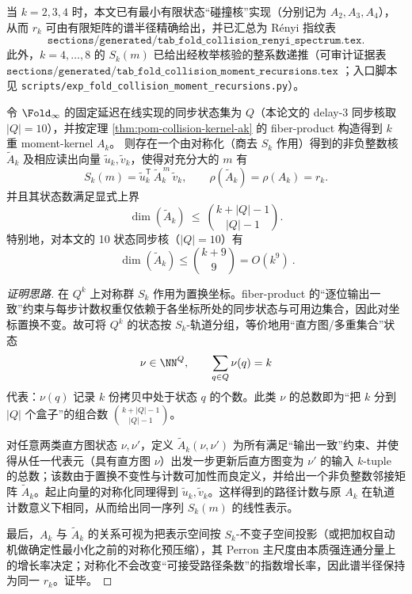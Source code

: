 \begin{remark}[与 $k=2,3,4$ 的一致性检查（已生成指纹）]\label{rem:pom-ak-consistency}
当 $k=2,3,4$ 时，本文已有最小有限状态“碰撞核”实现（分别记为 $A_2,A_3,A_4$），从而 $r_k$ 可由有限矩阵的谱半径精确给出，并已汇总为 Rényi 指纹表
\[
\texttt{sections/generated/tab\_fold\_collision\_renyi\_spectrum.tex}.
\]
此外，$k=4,\dots,8$ 的 $S_k(m)$ 已给出经枚举核验的整系数递推（可审计证据表
\(
\texttt{sections/generated/tab\_fold\_collision\_moment\_recursions.tex}
\)
；入口脚本见 \texttt{scripts/exp\_fold\_collision\_moment\_recursions.py}）。
\end{remark}

\begin{proposition}\label{prop:pom-ak-symmetric-compression}
令 $\Fold_\infty$ 的固定延迟在线实现的同步状态集为 $Q$（本论文的 delay-$3$ 同步核取 $|Q|=10$），并按定理 \ref{thm:pom-collision-kernel-ak} 的 fiber-product 构造得到 $k$ 重 moment-kernel \(A_k\)。
则存在一个由对称化（商去 $S_k$ 作用）得到的非负整数核 \(\widetilde A_k\) 及相应读出向量 \(\widetilde u_k,\widetilde v_k\)，使得对充分大的 $m$ 有
\[
S_k(m)=\widetilde u_k^{\mathsf T}\,\widetilde A_k^{\,m}\,\widetilde v_k,
\qquad
\rho(\widetilde A_k)=\rho(A_k)=r_k.
\]
并且其状态数满足显式上界
\[
\dim(\widetilde A_k)\ \le\ \binom{k+|Q|-1}{|Q|-1}.
\]
特别地，对本文的 10 状态同步核（$|Q|=10$）有
\[
\boxed{\ \dim(\widetilde A_k)\le \binom{k+9}{9}=O(k^9)\ }.
\]
\end{proposition}
\begin{proof}[证明思路]
在 $Q^k$ 上对称群 $S_k$ 作用为置换坐标。fiber-product 的“逐位输出一致”约束与每步计数权重仅依赖于各坐标所处的同步状态与可用边集合，因此对坐标置换不变。故可将 $Q^k$ 的状态按 $S_k$-轨道分组，等价地用“直方图/多重集合”状态
\[
\nu\in\NN^{Q},\qquad \sum_{q\in Q}\nu(q)=k
\]
代表：$\nu(q)$ 记录 $k$ 份拷贝中处于状态 $q$ 的个数。此类 $\nu$ 的总数即为“把 $k$ 分到 $|Q|$ 个盒子”的组合数 \(\binom{k+|Q|-1}{|Q|-1}\)。

对任意两类直方图状态 $\nu,\nu'$，定义 \(\widetilde A_k(\nu,\nu')\) 为所有满足“输出一致”约束、并使得从任一代表元（具有直方图 $\nu$）出发一步更新后直方图变为 $\nu'$ 的输入 $k$-tuple 的总数；该数由于置换不变性与计数可加性而良定义，并给出一个非负整数邻接矩阵 \(\widetilde A_k\)。起止向量的对称化同理得到 \(\widetilde u_k,\widetilde v_k\)。这样得到的路径计数与原 $A_k$ 在轨道计数意义下相同，从而给出同一序列 $S_k(m)$ 的线性表示。

最后，$A_k$ 与 $\widetilde A_k$ 的关系可视为把表示空间按 $S_k$-不变子空间投影（或把加权自动机做确定性最小化之前的对称化预压缩），其 Perron 主尺度由本质强连通分量上的增长率决定；对称化不会改变“可接受路径条数”的指数增长率，因此谱半径保持为同一 \(r_k\)。证毕。
\end{proof}

